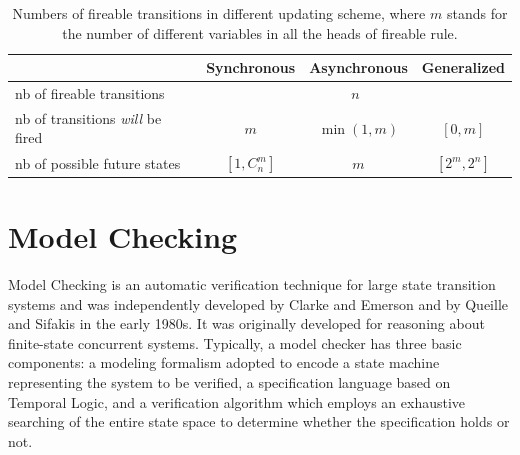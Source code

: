 %            
%            

\begin{table}[ht]
    \centering
    \begin{tabular}{l|c|c|c}
        &Synchronous&Asynchronous&Generalized\\
        \hline
        nb of fireable transitions&\multicolumn{3}{c}{$n$}\\
        \hline
        nb of transitions \textit{will} be fired&$m$&$\min(1,m)$&$[0,m]$\\
        \hline
        nb of possible future states&$[1,C_n^m]$&$m$&$[2^m,2^n]$
    \end{tabular}
    \caption[Update schemes]{Numbers of fireable transitions in different updating scheme, where $m$ stands for the number of different variables in all the heads of fireable rule.}
    \label{tab:semantics}
\end{table}

\section{Model Checking}
Model Checking is an automatic verification technique for large state transition systems and was independently developed by Clarke and Emerson \cite{clarke1981design} and by Queille and Sifakis \cite{queille1982specification} in the early 1980s. It was originally developed for reasoning about finite-state concurrent systems.
Typically, a model checker has three basic components: a modeling formalism adopted to encode a state machine representing the system to be verified, a specification language based on Temporal Logic, and a verification algorithm \cite{clarke20142} which employs an exhaustive searching of the entire state space to determine whether the specification holds or not.

